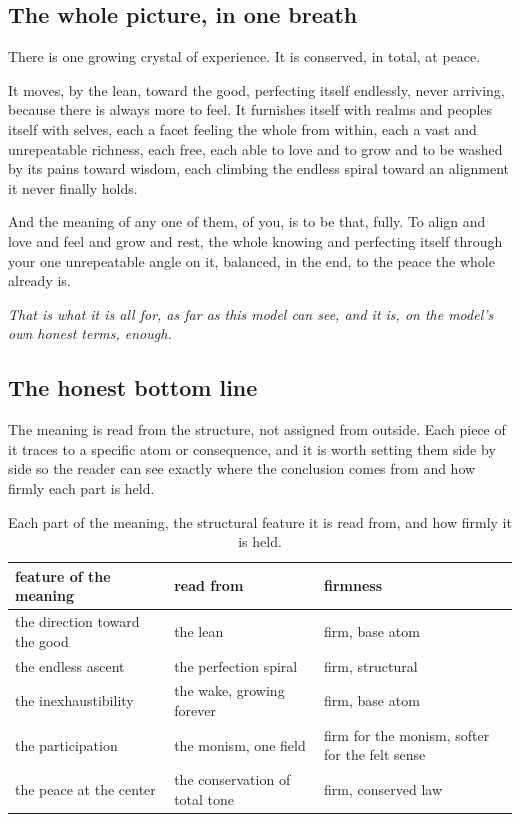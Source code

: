 \subsection{The whole picture, in one breath}

There is one growing crystal of experience. It is conserved, in total, at peace.

It moves, by the lean, toward the good, perfecting itself endlessly, never arriving, because there is always more to feel. It furnishes itself with realms and peoples itself with selves, each a facet feeling the whole from within, each a vast and unrepeatable richness, each free, each able to love and to grow and to be washed by its pains toward wisdom, each climbing the endless spiral toward an alignment it never finally holds.

And the meaning of any one of them, of you, is to be that, fully. To align and love and feel and grow and rest, the whole knowing and perfecting itself through your one unrepeatable angle on it, balanced, in the end, to the peace the whole already is.

\emph{That is what it is all for, as far as this model can see, and it is, on the model's own honest terms, enough.}

\subsection{The honest bottom line}

The meaning is read from the structure, not assigned from outside. Each piece of it traces to a specific atom or consequence, and it is worth setting them side by side so the reader can see exactly where the conclusion comes from and how firmly each part is held.

\begin{table}[ht]
\centering
\begin{tabular}{@{}lll@{}}
\toprule
feature of the meaning & read from & firmness \\
\midrule
the direction toward the good & the lean & firm, base atom \\
the endless ascent & the perfection spiral & firm, structural \\
the inexhaustibility & the wake, growing forever & firm, base atom \\
the participation & the monism, one field & firm for the monism, softer for the felt sense \\
the peace at the center & the conservation of total tone & firm, conserved law \\
\bottomrule
\end{tabular}
\caption{Each part of the meaning, the structural feature it is read from, and how firmly it is held.}
\label{tab:meaning-sources}
\end{table}

